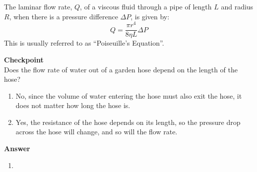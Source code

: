 The laminar flow rate, $Q$, of a viscous fluid through a pipe of length $L$ and radius $R$, when there is a pressure difference $\Delta P$, is given by:
\begin{equation}
\boxed{Q =  \frac{\pi r^4}{8\eta L}\Delta P}
\end{equation}
This is usually referred to as ``Poiseuille's Equation''.

\begin{framed}
\textbf{Checkpoint}\\
Does the flow rate of water out of a garden hose depend on the length of the hose?

\begin{enumerate}
\item No, since the volume of water entering the hose must also exit the hose, it does not matter how long the hose is.
\item Yes, the resistance of the hose depends on its length, so the pressure drop across the hose will change, and so will the flow rate.
\end{enumerate}

\begin{framed}
\textbf{Answer}\\
\begin{enumerate}[resume]
\item
\end{enumerate}
\end{framed}
\end{framed}

